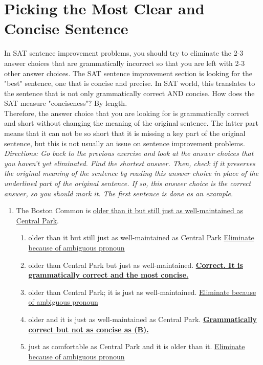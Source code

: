 \section{Picking the Most Clear and Concise Sentence}

In SAT sentence improvement problems, you should try to eliminate the 2-3 answer choices that are grammatically incorrect so that you are left with 2-3 other answer choices. The SAT sentence improvement section is looking for the "best" sentence, one that is concise and precise. In SAT world, this translates to the sentence that is not only grammatically correct AND concise. How does the SAT measure "conciseness"? By length. \\

Therefore, the answer choice that you are looking for is grammatically correct and short without changing the meaning of the original sentence. The latter part means that it can not be so short that it is missing a key part of the original sentence,
but this is not usually an issue on sentence improvement problems. \\

\textit{Directions: Go back to the previous exercise and look at the answer choices that you haven't yet eliminated. Find the shortest answer. Then, check if it preserves the original meaning of the sentence by reading this answer choice in place of the underlined part of the original sentence. If so, this answer choice is the correct answer, so you should mark it. The first sentence is done as an example.}

\begin{enumerate}
\item The Boston Common is \ul{ older than it but still just as well-maintained as Central Park}.
\begin{enumerate}[label=(\Alph*)]

\item older than it but still just as well-maintained as Central Park  \ul{Eliminate because of ambiguous pronoun}
\item older than Central Park but just as well-maintained. \textbf{\ul{Correct. It is grammatically correct and the most concise. }}
\item  older than Central Park; it is just as well-maintained.    \ul{Eliminate because of ambiguous pronoun}
\item older and it is just as well-maintained as Central Park. \textbf{\ul{Grammatically correct but not as concise as (B).}}
\item just as comfortable as Central Park and it is older than it. \ul{Eliminate because of ambiguous pronoun}

\end{enumerate}

\end{enumerate} 